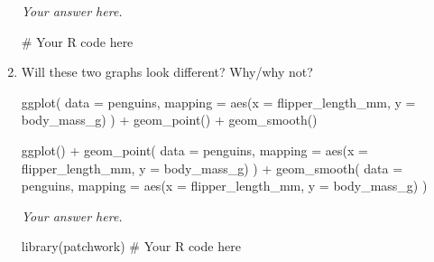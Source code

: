 \documentclass[
  letterpaper,
  DIV=11,
  numbers=noendperiod]{scrreprt}
\newenvironment{Shaded}{\begin{snugshade}}{\end{snugshade}}
\newcommand{\AttributeTok}[1]{\textcolor[rgb]{0.40,0.45,0.13}{#1}}
\newcommand{\CommentTok}[1]{\textcolor[rgb]{0.37,0.37,0.37}{#1}}
\newcommand{\FunctionTok}[1]{\textcolor[rgb]{0.28,0.35,0.67}{#1}}
\newcommand{\NormalTok}[1]{\textcolor[rgb]{0.00,0.23,0.31}{#1}}
\newcommand{\SpecialCharTok}[1]{\textcolor[rgb]{0.37,0.37,0.37}{#1}}
\begin{document}
\begin{enumerate}
\begin{tcolorbox}
  \emph{Your answer here.}

\begin{Shaded}
\begin{Highlighting}[]
\CommentTok{\# Your R code here}
\end{Highlighting}
\end{Shaded}

  \end{tcolorbox}
\item
  Will these two graphs look different? Why/why not?

\begin{Shaded}
\begin{Highlighting}[]
\FunctionTok{ggplot}\NormalTok{(}
  \AttributeTok{data =}\NormalTok{ penguins,}
  \AttributeTok{mapping =} \FunctionTok{aes}\NormalTok{(}\AttributeTok{x =}\NormalTok{ flipper\_length\_mm, }\AttributeTok{y =}\NormalTok{ body\_mass\_g)}
\NormalTok{) }\SpecialCharTok{+}
  \FunctionTok{geom\_point}\NormalTok{() }\SpecialCharTok{+}
  \FunctionTok{geom\_smooth}\NormalTok{()}

\FunctionTok{ggplot}\NormalTok{() }\SpecialCharTok{+}
  \FunctionTok{geom\_point}\NormalTok{(}
    \AttributeTok{data =}\NormalTok{ penguins,}
    \AttributeTok{mapping =} \FunctionTok{aes}\NormalTok{(}\AttributeTok{x =}\NormalTok{ flipper\_length\_mm, }\AttributeTok{y =}\NormalTok{ body\_mass\_g)}
\NormalTok{  ) }\SpecialCharTok{+}
  \FunctionTok{geom\_smooth}\NormalTok{(}
    \AttributeTok{data =}\NormalTok{ penguins,}
    \AttributeTok{mapping =} \FunctionTok{aes}\NormalTok{(}\AttributeTok{x =}\NormalTok{ flipper\_length\_mm, }\AttributeTok{y =}\NormalTok{ body\_mass\_g)}
\NormalTok{  )}
\end{Highlighting}
\end{Shaded}

  \begin{tcolorbox}[enhanced jigsaw, breakable, bottomtitle=1mm, left=2mm, colback=white, toprule=.15mm, leftrule=.75mm, colframe=quarto-callout-note-color-frame, colbacktitle=quarto-callout-note-color!10!white, title={Answer}, coltitle=black, toptitle=1mm, bottomrule=.15mm, opacitybacktitle=0.6, arc=.35mm, rightrule=.15mm, titlerule=0mm, opacityback=0]

  \emph{Your answer here.}

\begin{Shaded}
\begin{Highlighting}[]
\FunctionTok{library}\NormalTok{(patchwork)}
\CommentTok{\# Your R code here}
\end{Highlighting}
\end{Shaded}


\end{tcolorbox}
\end{enumerate}
\end{document}
